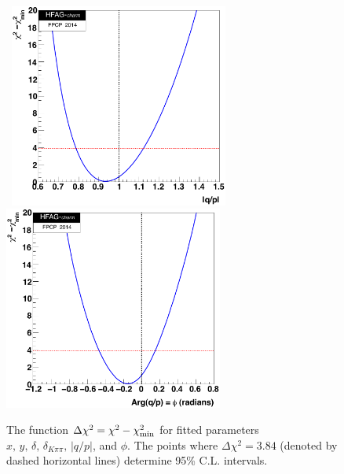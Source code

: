 \begin{figure}
\begin{center}
\hbox{\hskip0.50in
\includegraphics[width=72mm]{figures/charm/fig_plot_q1d}
\hskip0.20in
\includegraphics[width=72mm]{figures/charm/fig_plot_p1d}}
\end{center}
\vskip-0.30in
\caption{\label{fig:1dlikelihood}
The function $\Delta\chi^2=\chi^2-\chi^2_{\rm min}$ 
for fitted parameters
$x,\,y,\,\delta,\,\delta^{}_{K\pi\pi},\,|q/p|$, and $\phi$.
The points where $\Delta\chi^2=3.84$ (denoted by dashed 
horizontal lines) determine 95\% C.L. intervals. }
\end{figure}


